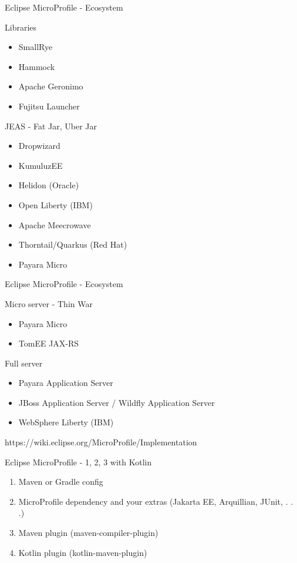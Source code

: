 \documentclass[aspectratio=169]{beamer}
\begin{document}
\begin{frame}{Eclipse MicroProfile - Ecosystem}

Libraries
\begin{itemize}
	\item SmallRye
	\item Hammock
	\item Apache Geronimo
	\item Fujitsu Launcher
\end{itemize}
	
JEAS - Fat Jar, Uber Jar
\begin{itemize}
	\item Dropwizard
	\item KumuluzEE
	\item Helidon (Oracle)
	\item Open Liberty (IBM)
	\item Apache Meecrowave
	\item Thorntail/Quarkus (Red Hat)
	\item Payara Micro
\end{itemize}
\end{frame}
\begin{frame}{Eclipse MicroProfile - Ecosystem}

Micro server - Thin War
\begin{itemize}
	\item Payara Micro
	\item TomEE JAX-RS
\end{itemize}

Full server
\begin{itemize}
	\item Payara Application Server
	\item JBoss Application Server / Wildfly Application Server
	\item WebSphere Liberty (IBM)
\end{itemize}

https://wiki.eclipse.org/MicroProfile/Implementation
\end{frame}


\begin{frame}{Eclipse MicroProfile - 1, 2, 3 with Kotlin}
\begin{enumerate}
	\item Maven or Gradle config
	\item MicroProfile dependency and your extras (Jakarta EE, Arquillian, JUnit, . . .)
	\item Maven plugin (maven-compiler-plugin)
	\item Kotlin plugin (kotlin-maven-plugin)
\end{enumerate}
\end{frame}
\end{document}
